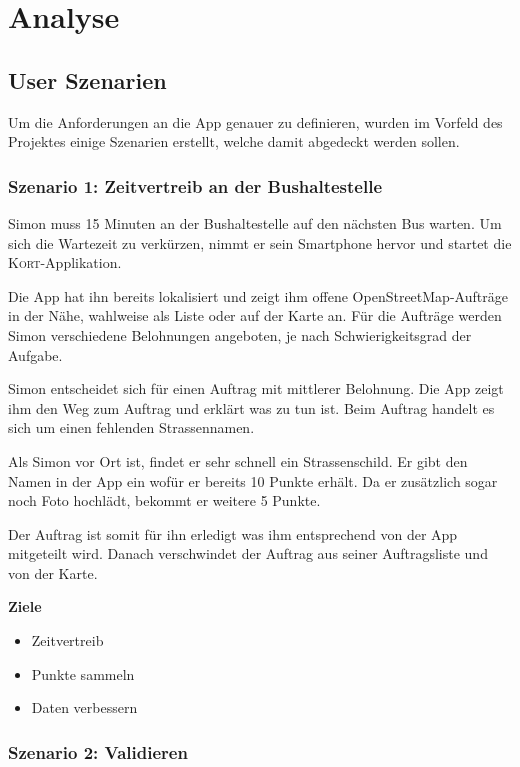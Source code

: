 \section{Analyse}

\subsection{User Szenarien}
\label{kort-user-szenarien}

Um die Anforderungen an die App genauer zu definieren, wurden im Vorfeld des Projektes einige Szenarien erstellt, welche damit abgedeckt werden sollen.

\subsubsection{Szenario 1: Zeitvertreib an der Bushaltestelle}

Simon muss 15 Minuten an der Bushaltestelle auf den nächsten Bus warten.
Um sich die Wartezeit zu verkürzen, nimmt er sein Smartphone hervor und startet die \textsc{Kort}-Applikation.

Die App hat ihn bereits lokalisiert und zeigt ihm offene \gls{OpenStreetMap}-Aufträge in der Nähe, wahlweise als Liste oder auf der Karte an.
Für die Aufträge werden Simon verschiedene Belohnungen angeboten, je nach Schwierigkeitsgrad der Aufgabe.

Simon entscheidet sich für einen Auftrag mit mittlerer Belohnung.
Die App zeigt ihm den Weg zum Auftrag und erklärt was zu tun ist. Beim Auftrag handelt es sich um einen fehlenden Strassennamen.

Als Simon vor Ort ist, findet er sehr schnell ein Strassenschild.
Er gibt den Namen in der App ein wofür er bereits 10 Punkte erhält.
Da er zusätzlich sogar noch Foto hochlädt, bekommt er weitere 5 Punkte.

Der Auftrag ist somit für ihn erledigt was ihm entsprechend von der App mitgeteilt wird.
Danach verschwindet der Auftrag aus seiner Auftragsliste und von der Karte.

\textbf{Ziele}
\begin{itemize}
\item Zeitvertreib
\item Punkte sammeln
\item Daten verbessern
\end{itemize}

\subsubsection{Szenario 2: Validieren}

